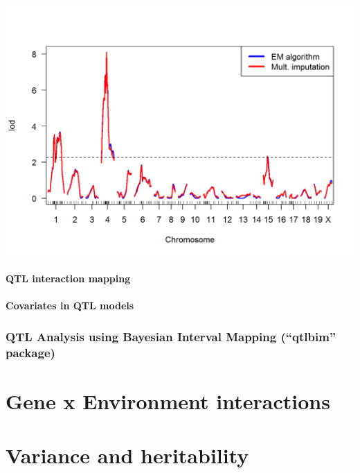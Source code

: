 \documentclass[12pt,]{book}
\let\oldparagraph\paragraph
\renewcommand{\paragraph}[1]{\oldparagraph{#1}\mbox{}}
\theoremstyle{definition}
\theoremstyle{definition}
\theoremstyle{remark}
\begin{document}
\includegraphics{_main_files/figure-html/unnamed-chunk-16-1}

\paragraph{QTL interaction mapping}\label{qtl-interaction-mapping}

\paragraph{Covariates in QTL models}\label{covariates-in-qtl-models}

\subsubsection{\texorpdfstring{QTL Analysis using Bayesian Interval
Mapping (``qtlbim''
package)}{QTL Analysis using Bayesian Interval Mapping (qtlbim package)}}\label{qtl-analysis-using-bayesian-interval-mapping-qtlbim-package}

\section{Gene x Environment
interactions}\label{gene-x-environment-interactions}

\section{Variance and heritability}\label{variance-and-heritability}
\end{document}

